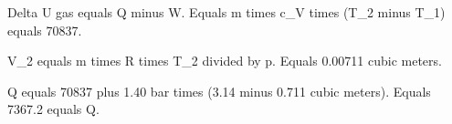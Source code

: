 Delta U gas equals Q minus W.  
Equals m times c_V times (T_2 minus T_1) equals 70837.  

V_2 equals m times R times T_2 divided by p.  
Equals 0.00711 cubic meters.  

Q equals 70837 plus 1.40 bar times (3.14 minus 0.711 cubic meters).  
Equals 7367.2 equals Q.